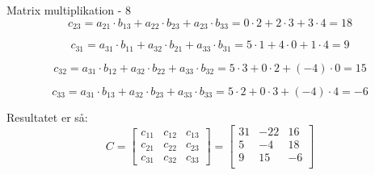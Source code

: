 \documentclass{article}
\begin{document}
\begin{exercise}{Matrix multiplikation - 8}
	\hint
	\[
		c_{23} = a_{21} \cdot b_{13} + a_{22} \cdot b_{23} + a_{23} \cdot b_{33}   = 0 \cdot 2 + 2 \cdot 3 + 3 \cdot 4 = 18
	\]
	
	\hint
	\[
		c_{31} = a_{31} \cdot b_{11} + a_{32} \cdot b_{21} + a_{33} \cdot b_{31} = 5 \cdot 1 + 4 \cdot 0 + 1 \cdot 4 = 9
	\]	
	
	\hint
	\[
		c_{32} = a_{31} \cdot b_{12} + a_{32} \cdot b_{22} + a_{33} \cdot b_{32}  = 5 \cdot 3 + 0 \cdot 2 + (-4) \cdot 0 = 15
	\]
	
	\hint
	\[
		c_{33} = a_{31} \cdot b_{13} + a_{32} \cdot b_{23} + a_{33} \cdot b_{33} = 5 \cdot 2 + 0 \cdot 3 + (-4) \cdot 4 = -6
	\]	
	
	
	
	\hint
	Resultatet er så:
	\[
	C = \left[\begin{array}{rrr}
	c_{11} & c_{12} & c_{13} \\
	c_{21} & c_{22} & c_{23} \\
	c_{31} & c_{32} & c_{33}
	\end{array} \right] = 
	\left[\begin{array}{rrr}
	31 & -22 & 16 \\
	5 & -4 & 18 \\
	9 & 15 & -6 \\
	\end{array} \right]
	\]
	
	
\end{exercise}

\newpage
\end{document}
